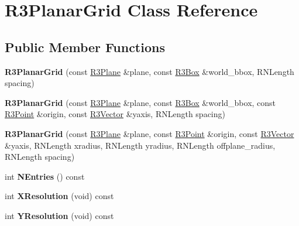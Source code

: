 \hypertarget{class_r3_planar_grid}{}\section{R3\+Planar\+Grid Class Reference}
\label{class_r3_planar_grid}
\subsection*{Public Member Functions}
\begin{DoxyCompactItemize}
\item 
{\bfseries R3\+Planar\+Grid} (const \hyperlink{class_r3_plane}{R3\+Plane} \&plane, const \hyperlink{class_r3_box}{R3\+Box} \&world\+\_\+bbox, R\+N\+Length spacing)\hypertarget{class_r3_planar_grid_ac891cfdd5fcb70dc016bd8861d4db3c7}{}\label{class_r3_planar_grid_ac891cfdd5fcb70dc016bd8861d4db3c7}

\item 
{\bfseries R3\+Planar\+Grid} (const \hyperlink{class_r3_plane}{R3\+Plane} \&plane, const \hyperlink{class_r3_box}{R3\+Box} \&world\+\_\+bbox, const \hyperlink{class_r3_point}{R3\+Point} \&origin, const \hyperlink{class_r3_vector}{R3\+Vector} \&yaxis, R\+N\+Length spacing)\hypertarget{class_r3_planar_grid_a801ee5cba9c7befa12c6385be752d852}{}\label{class_r3_planar_grid_a801ee5cba9c7befa12c6385be752d852}

\item 
{\bfseries R3\+Planar\+Grid} (const \hyperlink{class_r3_plane}{R3\+Plane} \&plane, const \hyperlink{class_r3_point}{R3\+Point} \&origin, const \hyperlink{class_r3_vector}{R3\+Vector} \&yaxis, R\+N\+Length xradius, R\+N\+Length yradius, R\+N\+Length offplane\+\_\+radius, R\+N\+Length spacing)\hypertarget{class_r3_planar_grid_a2b281aa98dca77597c967d633474ab96}{}\label{class_r3_planar_grid_a2b281aa98dca77597c967d633474ab96}

\item 
int {\bfseries N\+Entries} () const \hypertarget{class_r3_planar_grid_a58be9d1568ca481b05ecdc05bd825fb5}{}\label{class_r3_planar_grid_a58be9d1568ca481b05ecdc05bd825fb5}

\item 
int {\bfseries X\+Resolution} (void) const \hypertarget{class_r3_planar_grid_a32436da37d9b148f8c105a3053e24c0d}{}\label{class_r3_planar_grid_a32436da37d9b148f8c105a3053e24c0d}

\item 
int {\bfseries Y\+Resolution} (void) const \hypertarget{class_r3_planar_grid_a8b97bbd458fb8f50c2d8fb0909bfdd84}{}\label{class_r3_planar_grid_a8b97bbd458fb8f50c2d8fb0909bfdd84}


\end{DoxyCompactItemize}

